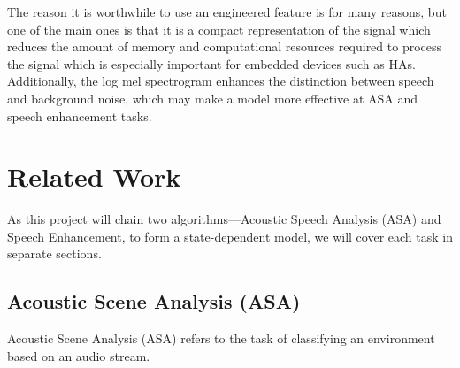 \documentclass[logo,bsc,singlespacing,parskip,online]{infthesis}
\begin{document}
The reason it is worthwhile to use an engineered feature is for many reasons, but one of the main ones is that 
it is a compact representation of the signal which reduces the amount of memory and computational resources required 
to process the signal which is especially important for embedded devices such as HAs. 
Additionally, the log mel spectrogram enhances the distinction between speech and background noise, which 
may make a model more effective at ASA and speech enhancement tasks.
\section{Related Work}
As this project will chain two algorithms—Acoustic Speech Analysis (ASA) and Speech Enhancement, 
to form a state-dependent model, we will cover each task in separate sections.

\subsection{Acoustic Scene Analysis (ASA)}
Acoustic Scene Analysis (ASA) refers to the task of classifying an environment based on an audio stream. 

\end{document}
